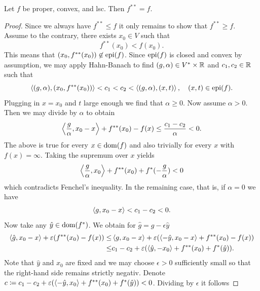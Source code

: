 \begin{lemma}
    Let $f$ be proper, convex, and lsc. Then $f^{**} = f$.
\end{lemma}
\begin{proof}
    Since we always have $f^{**}\leq f$ it only remains to show that $f^{**}\geq f$. Assume to the contrary, there exists $x_0\in V$ such that
    \begin{equation}
        f^{**}(x_0) < f(x_0).
    \end{equation}
    This means that $(x_0, f^{**}(x_0))\not\in \operatorname{\mathrm{epi}}(f)$. Since $\operatorname{\mathrm{epi}}(f)$ is closed and convex by assumption, we may apply Hahn-Banach to find $(g,\alpha)\in V^*\times \mathbb{R}$ and $c_1,c_2\in \mathbb{R}$ such that
    \begin{equation}
        \left\langle(g,\alpha) , (x_0,f^{**}(x_0))\right\rangle<c_1<c_2<\left\langle(g,\alpha) , (x,t)\right\rangle,\quad (x,t)\in \operatorname{\mathrm{epi}}(f).
    \end{equation}
    Plugging in $x=x_0$ and $t$ large enough we find that $\alpha\geq 0$. 
    Now assume $\alpha>0$. Then we may divide by $\alpha$ to obtain
    \begin{equation}
        \left\langle\frac{g}{\alpha} , x_0-x\right\rangle + f^{**}(x_0)-f(x)\leq \frac{c_1-c_2}{\alpha}<0.
    \end{equation}
    The above is true for every $x\in \operatorname{\mathrm{dom}}(f)$ and also trivially for every $x$ with $f(x)=\infty$. Taking the supremum over $x$ yields
    \begin{equation}
        \left\langle\frac{g}{\alpha} , x_0\right\rangle + f^{**}(x_0)+f^*(-\frac{g}{\alpha})<0
    \end{equation}
    which contradicts Fenchel's inequality.
    In the remaining case, that is, if $\alpha=0$ we have
    \begin{equation}
        \left\langle g , x_0-x\right\rangle < c_1-c_2<0.
    \end{equation}
    Now take any $\hat y\in \operatorname{\mathrm{dom}}(f^*)$. We obtain for $\hat g = g-\epsilon \hat y$
    \begin{equation}
        \begin{aligned}
            \left\langle\hat g , x_0-x\right\rangle + \varepsilon(f^{**}(x_0)-f(x))
            \leq& \left\langle g , x_0-x\right\rangle + \varepsilon( \left\langle-\hat y , x_0-x\right\rangle + f^{**}(x_0)-f(x))\\
            \leq& c_1-c_2 + \varepsilon( \left\langle\hat y , -x_0\right\rangle + f^{**}(x_0)+f^*(\hat y)).
        \end{aligned}
    \end{equation}
    Note that $\hat y$ and $x_0$ are fixed and we may choose $\epsilon>0$ sufficiently small so that the right-hand side remains strictly negativ. Denote $c \coloneqq c_1-c_2 + \varepsilon( \left\langle-\hat y , x_0\right\rangle + f^{**}(x_0)+f^*(\hat y))<0$. Dividing by $\epsilon$ it follows

\end{proof}
